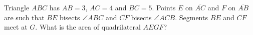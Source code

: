 Triangle $ABC$ has $AB=3$, $AC=4$ and $BC=5$. Points $E$ on $\overline{AC}$ and $F$ on $\overline{AB}$ are such that $\overline{BE}$ bisects $\angle ABC$ and $\overline{CF}$ bisects $\angle ACB$. Segments $\overline{BE}$ and $\overline{CF}$ meet at $G$. What is the area of quadrilateral $AEGF$?
